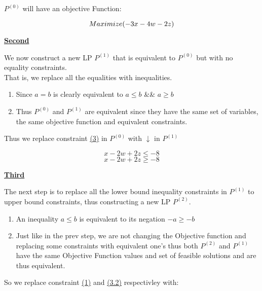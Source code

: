 \documentclass{article}
\numberwithin{equation}{subsection}
\begin{document}
	\par{
		$P^{(0)}$ will have an objective Function:
	}

	\begin{equation}\notag
		Maximize(-3x-4w-2z)
	\end{equation}

	\vspace{15pt}
	\textbf{\underline{Second}}
	\par{
		We now construct a new LP  $P^{(1)}$ that is equivalent to $P^{(0)}$ but with no
		equality constraints.\\ 
		That is, we replace all the equalities with inequalities.
		\begin{enumerate}
			\item Since $a=b$ is clearly equivalent to $a\le b$ \&\& $a \ge b$ 
			\item Thus $P^{(0)}$ and $P^{(1)}$ are equivalent since they have the same 
				set of variables, the same objective function and equivalent constraints.  
		\end{enumerate}
	}

	\par{
		Thus we replace constraint \hyperref[q1-3]{(3)} in $P^{(0)}$ with $\downarrow$ in $P^{(1)}$
	}

	\begin{equation}\label{q1-3.1}\tag{3.1}
		x-2w+2z \leq -8
	\end{equation}
	\begin{equation}\label{q1-3.2}\tag{3.2}
		x-2w+2z \ge -8
	\end{equation}

	\newpage
	\textbf{\underline{Third}}
	\par{
		The next step is to replace all the lower bound inequality constraints 
		in $P^{(1)}$ to upper bound constraints, thus constructing a new LP $P^{(2)}$.
	}

	\begin{enumerate}
		\item An inequality $a\le b$ is equivalent to its negation $-a \ge -b$
		\item Just like in the prev step, we are not changing the Objective function
			and replacing some constraints with equivalent one's thus both $P^{(2)}$ and 
			$P^{(1)}$ have the same Objective Function values and set of feasible solutions and are thus
			equivalent.
	\end{enumerate}

	\par{
		So we replace constraint \hyperref[q1-1]{(1)} and \hyperref[q1-3.2]{(3.2)} respectivley with:
	}
\end{document}

